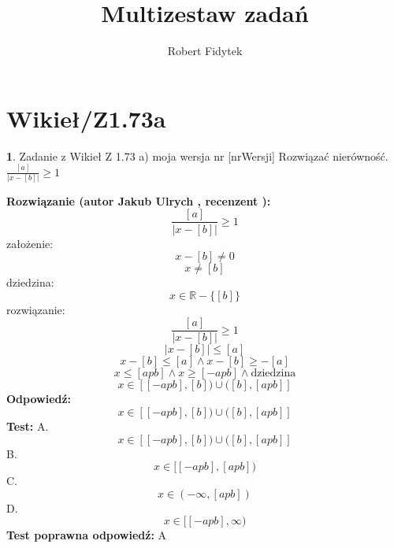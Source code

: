 \documentclass[12pt, a4paper]{article}
\title{Multizestaw zadań}
\author{Robert Fidytek}
\date{}
\theoremstyle{definition} %
\newtheorem{zad}{}
\newcommand{\kategoria}[1]{\section{#1}} %
\newcommand{\zadStart}[1]{\begin{zad}#1\newline} %
\newcommand{\zadStop}{\end{zad}}   %
\newcommand{\rozwStart}[2]{\noindent \textbf{Rozwiązanie (autor #1 , recenzent #2): }\newline} %
\newcommand{\rozwStop}{\newline}                                            %
\newcommand{\odpStart}{\noindent \textbf{Odpowiedź:}\newline}    %
\newcommand{\odpStop}{\newline}                                             %
\newcommand{\testStart}{\noindent \textbf{Test:}\newline} %
\newcommand{\testStop}{\newline} %
\newcommand{\kluczStart}{\noindent \textbf{Test poprawna odpowiedź:}\newline} %
\newcommand{\kluczStop}{\newline} %
\begin{document}
\maketitle


\kategoria{Wikieł/Z1.73a}
\zadStart{Zadanie z Wikieł Z 1.73 a) moja wersja nr [nrWersji]}
Rozwiązać nierówność.$\frac{[a]}{|x-[b]|}\geq1$
\zadStop
\rozwStart{Jakub Ulrych}{}
$$\frac{[a]}{|x-[b]|}\geq1$$
założenie: $$x-[b]\neq0$$
$$x\neq[b]$$
dziedzina:$$x\in\mathbb{R}-\{[b]\}$$
rozwiązanie:$$\frac{[a]}{|x-[b]|}\geq1$$
$$|x-[b]|\leq[a]$$
$$x-[b]\leq[a]\land x-[b]\geq-[a]$$
$$x\leq[apb]\land x\geq[-apb]\land\text{dziedzina}$$
$$x\in[[-apb],[b])\cup([b],[apb]]$$
\rozwStop
\odpStart
$$x\in[[-apb],[b])\cup([b],[apb]]$$
\odpStop
\testStart
A.$$x\in[[-apb],[b])\cup([b],[apb]]$$
B.$$x\in[[-apb],[apb])$$
C.$$x\in(-\infty,[apb])$$
D.$$x\in[[-apb],\infty)$$
\testStop
\kluczStart
A
\kluczStop
\end{document}
